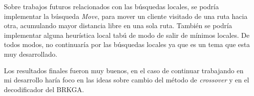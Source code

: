 \bigskip

Sobre trabajos futuros relacionados con las búsquedas locales, se podría implementar la búsqueda \textit{Move}, para mover un cliente visitado de una ruta hacia otra, acumulando mayor distancia libre en una sola ruta. También se podría implementar alguna heurística local tabú de modo de salir de mínimos locales. De todos modos, no continuaría por las búsquedas locales ya que es un tema que esta muy desarrollado.

\bigskip

Los resultados finales fueron muy buenos, en el caso de continuar trabajando en mi desarrollo haría foco en las ideas sobre cambio del método de \textit{crossover} y en el decodificador del BRKGA.








